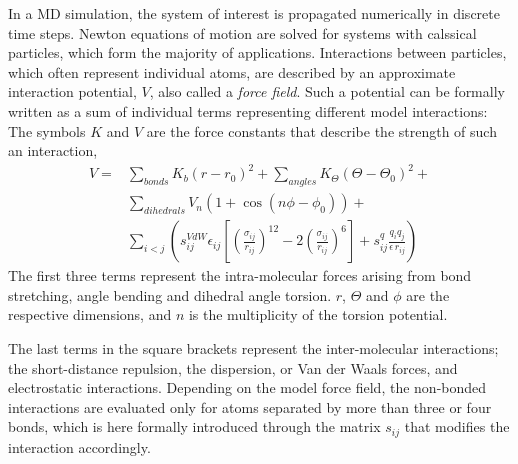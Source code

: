 In a MD simulation, the system of interest is propagated numerically in discrete time steps.
Newton equations of motion are solved for systems with calssical particles, which form the majority of applications.
Interactions between particles, which often represent individual atoms, 
are described by an approximate interaction potential, $V$, also called a \emph{force field}. 
Such a potential can be formally written as a sum of individual terms representing different model interactions:
The symbols $K$ and $V$ are the force constants that describe the strength of such an interaction,
\begin{eqnarray}  \label{eq:amber}
  V = & \displaystyle \sum _{bonds} K_b (r-r_{0})^2 + \sum _{angles} K_\Theta (\Theta-\Theta_{0})^2 + \\ \nonumber
      & \displaystyle \sum _{dihedrals} V_n (1+\cos(n\phi -\phi_0)) + \\ \nonumber
      & \displaystyle \sum _{i<j} \left ( s_{ij} ^{VdW} \epsilon _{ij} \left [ \left (\frac{\sigma _{ij}}{r_{ij}} \right )^{12} - 2 \left ( \frac{\sigma _{ij}}{r_{ij}} \right )^6 \right ] + s_{ij}^q \frac{q_i q_j}{\epsilon \, r_{ij}} \right )
\end{eqnarray}
The first three terms represent the intra-molecular forces arising from bond stretching, angle bending and dihedral angle torsion. 
$r$, $\Theta$ and $\phi$ are the respective dimensions,
and $n$ is the multiplicity of the torsion potential. 

The last terms in the square brackets represent the inter-molecular interactions; 
the short-distance repulsion, the dispersion, or Van der Waals forces, and electrostatic interactions. 
Depending on the model force field, the non-bonded interactions are evaluated only for atoms separated by more than three or four bonds, 
which is here formally introduced through the matrix $s_{ij}$ that modifies the interaction accordingly.

